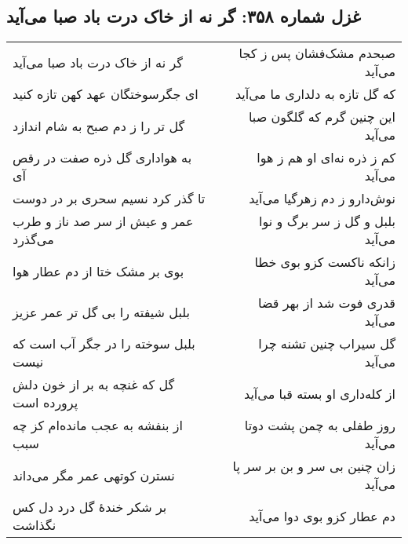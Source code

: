 \begin{center}
\section*{غزل شماره ۳۵۸: گر نه از خاک درت باد صبا می‌آید}
\label{sec:358}
\begin{longtable}{l p{0.5cm} r}
گر نه از خاک درت باد صبا می‌آید
&&
صبحدم مشک‌فشان پس ز کجا می‌آید
\\
ای جگرسوختگان عهد کهن تازه کنید
&&
که گل تازه به دلداری ما می‌آید
\\
گل تر را ز دم صبح به شام اندازد
&&
این چنین گرم که گلگون صبا می‌آید
\\
به هواداری گل ذره صفت در رقص آی
&&
کم ز ذره نه‌ای او هم ز هوا می‌آید
\\
تا گذر کرد نسیم سحری بر در دوست
&&
نوش‌دارو ز دم زهرگیا می‌آید
\\
عمر و عیش از سر صد ناز و طرب می‌گذرد
&&
بلبل و گل ز سر برگ و نوا می‌آید
\\
بوی بر مشک ختا از دم عطار هوا
&&
زانکه ناکست کزو بوی خطا می‌آید
\\
بلبل شیفته را بی گل تر عمر عزیز
&&
قدری فوت شد از بهر قضا می‌آید
\\
بلبل سوخته را در جگر آب است که نیست
&&
گل سیراب چنین تشنه چرا می‌آید
\\
گل که غنچه به بر از خون دلش پرورده است
&&
از کله‌داری او بسته قبا می‌آید
\\
از بنفشه به عجب مانده‌ام کز چه سبب
&&
روز طفلی به چمن پشت دوتا می‌آید
\\
نسترن کوتهی عمر مگر می‌داند
&&
زان چنین بی سر و بن بر سر پا می‌آید
\\
بر شکر خندهٔ گل درد دل کس نگذاشت
&&
دم عطار کزو بوی دوا می‌آید
\\
\end{longtable}
\end{center}
